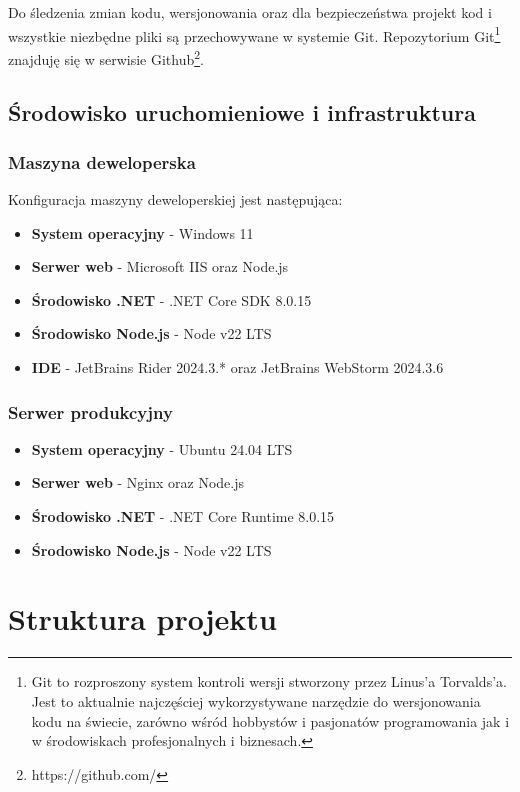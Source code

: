 Do śledzenia zmian kodu, wersjonowania oraz dla bezpieczeństwa projekt kod i wszystkie niezbędne pliki są przechowywane w systemie Git. Repozytorium Git\footnote{Git to rozproszony system kontroli wersji stworzony przez Linus'a Torvalds'a. Jest to aktualnie najczęściej wykorzystywane narzędzie do wersjonowania kodu na świecie, zarówno wśród hobbystów i pasjonatów programowania jak i w środowiskach profesjonalnych i biznesach.} znajduję się w serwisie Github\footnote{https://github.com/}.

\subsection{Środowisko uruchomieniowe i infrastruktura}

\subsubsection{Maszyna deweloperska}
Konfiguracja maszyny deweloperskiej jest następująca:
\begin{itemize}
	\item \textbf{System operacyjny} - Windows 11
	\item \textbf{Serwer web} - Microsoft IIS oraz Node.js
	\item \textbf{Środowisko .NET} - .NET Core SDK 8.0.15
	\item \textbf{Środowisko Node.js} - Node v22 LTS
	\item \textbf{IDE} - JetBrains Rider 2024.3.* oraz JetBrains WebStorm 2024.3.6
\end{itemize}

\subsubsection{Serwer produkcyjny}
\begin{itemize}
	\item \textbf{System operacyjny} - Ubuntu 24.04 LTS
	\item \textbf{Serwer web} - Nginx oraz Node.js
	\item \textbf{Środowisko .NET} - .NET Core Runtime 8.0.15
	\item \textbf{Środowisko Node.js} - Node v22 LTS
\end{itemize}

\section{Struktura projektu}

